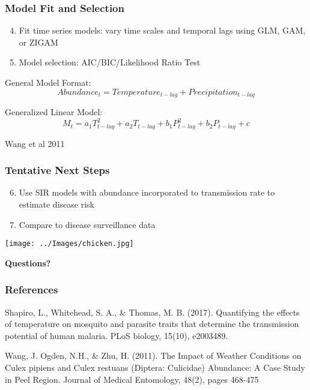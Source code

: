 \documentclass{beamer}
\begin{document}
\begin{frame}
\frametitle{Model Fit and Selection}

\begin{enumerate}
	\setcounter{enumi}{3}
	\item Fit time series models: vary time scales and temporal lags using GLM, GAM, or ZIGAM
	
	\item Model selection: AIC/BIC/Likelihood Ratio Test
	
\end{enumerate}
\vspace{0.1cm}
\small
General Model Format:
$$ Abundance_t = Temperature_{t-lag} + Precipitation_{t-lag} $$

Generalized Linear Model:
$$ M_t = a_1T_{t-lag}^2 + a_2T_{t-lag} + b_1P_{t-lag}^2 + b_2P_{t-lag} + c$$

\tiny Wang et al 2011

\end{frame}

\begin{frame}
\frametitle{Tentative Next Steps}

\begin{enumerate}
	\setcounter{enumi}{5}
	\item Use SIR models with abundance incorporated to transmission rate to estimate disease risk

\item Compare to disease surveillance data
	
\end{enumerate}
\vspace{0.7cm}

\texttt{[image: ../Images/chicken.jpg]}

\vspace{1cm}
\end{frame}

\begin{frame}
	\Huge \bfseries Questions?
\end{frame}

\begin{frame}
\frametitle{References}
\footnotesize
Shapiro, L., Whitehead, S. A., \& Thomas, M. B. (2017). Quantifying the effects of temperature on mosquito and parasite traits that determine the transmission potential of human malaria. PLoS biology, 15(10), e2003489. 

\vspace{0.5cm}
Wang, J. Ogden, N.H., \& Zhu, H. (2011). The Impact of Weather Conditions on Culex pipiens and Culex restuans (Diptera: Culicidae) Abundance: A Case Study in Peel Region. Journal of Medical Entomology, 48(2), pages 468-475


\end{frame}
\end{document}
